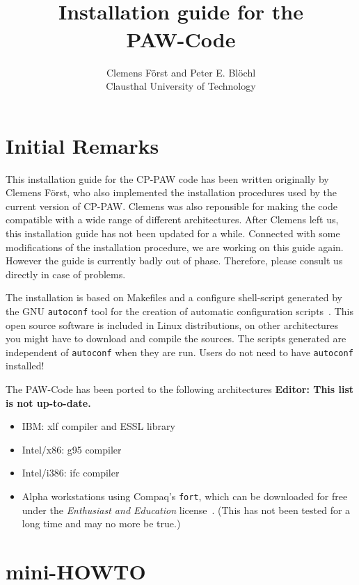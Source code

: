 \documentclass[a4paper,10pt]{article}
\title{\hrulefill \\ {\Large \bf Installation guide for the \\} 
                  {\Huge \bf PAW-Code} \\ \vspace*{-0.3cm} \hrulefill}
\author{\small  Clemens F\"orst and Peter E. Bl\"ochl\\ 
        \small Clausthal University of Technology \\ 
}
\date{}
\begin{document}
\maketitle
\tableofcontents

\section{Initial Remarks}
This installation guide for the CP-PAW code has been written
originally by Clemens F\"orst, who also implemented the installation
procedures used by the current version of CP-PAW. Clemens was also
reponsible for making the code compatible with a wide range of
different architectures. After Clemens left us, this installation
guide has not been updated for a while. Connected with some
modifications of the installation procedure, we are working on this
guide again. However the guide is currently badly out of phase.
Therefore, please consult us directly in case of problems.

The installation is based on Makefiles and a configure shell-script
generated by the GNU \texttt{autoconf} tool for the creation of
automatic configuration scripts~\cite{autoconf,autoconf2}.  This open
source software is included in Linux distributions, on other
architectures you might have to download and compile the sources.  The
scripts generated are independent of \texttt{autoconf} when they are
run. Users do not need to have \texttt{autoconf} installed!

The \textsc{PAW}-Code has been ported to the following architectures 
\textbf{Editor: This list is not up-to-date.}
\begin{itemize}
\item IBM: xlf compiler and ESSL library
\item Intel/x86: g95 compiler
\item Intel/i386: ifc compiler
\item Alpha workstations using Compaq's \texttt{fort}, which can be
  downloaded for free under the \textit{Enthusiast and Education}
  license~\cite{fort}. (This has not been tested for a long time and
  may no more be true.)
\end{itemize}


\section{mini-HOWTO}
\end{document}
